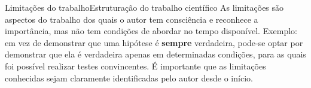 \documentclass[t]{beamer}
\begin{document}


\begin{ftst}{Limitações do trabalho}{Estruturação do trabalho científico}
\justifying
As limitações são aspectos do trabalho dos quais o autor tem consciência e reconhece a importância, mas não tem condições de abordar no tempo disponível.
\vone
Exemplo: em vez de demonstrar que uma hipótese é \textbf{sempre} verdadeira, pode-se optar por demonstrar que ela é verdadeira apenas em determinadas condições, para as quais foi possível realizar testes convincentes.
\vone
É importante que as limitações conhecidas sejam claramente identificadas pelo autor desde o início.

\end{ftst}

\end{document}
